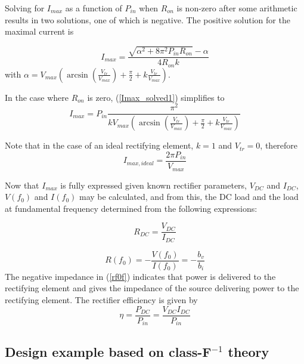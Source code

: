 Solving for $I_{max}$ as a function of $P_{in}$ when $R_{on}$ is non-zero after some arithmetic results in two solutions, one of which is negative. The positive solution for the maximal current is

\begin{equation}\label{Imax_solved1}
    I_{max} = \frac{ \sqrt{\alpha^2 + 8\pi^2P_{in}R_{on}}-\alpha}{4R_{on}k}
\end{equation}
with $\alpha=V_{max}\left(\arcsin\left(\frac{V_{tr}}{V_{max}}\right)+ \frac{\pi}{2} + k\frac{V_{tr}}{V_{max}}\right)$.

In the case where $R_{on}$ is zero, (\ref{Imax_solved1}) simplifies to
\begin{equation}\label{Imax_solve_zeroron_solved}
    I_{max} = P_{in}\frac{\pi^2}{kV_{max}\left(\arcsin\left(\frac{V_{tr}}{V_{max}}\right)+ \frac{\pi}{2} + k\frac{V_{tr}}{V_{max}}\right)}
\end{equation}

Note that in the case of an ideal rectifying element, $k = 1$ and $V_{tr} = 0$, therefore
\begin{equation}\label{Imax_solve_zeroron_solved_ideal}
    I_{max,ideal} = \frac{2\pi P_{in}}{V_{max}}
\end{equation}

Now that $I_{max}$ is fully expressed given known rectifier parameters, $V_{DC}$ and $I_{DC}$, $V(f_0)$ and $I(f_0)$ may be calculated, and from this, the DC load and the load at fundamental frequency determined from the following expressions:

\begin{equation}\label{rdcf}
    R_{DC} = \frac{V_{DC}}{I_{DC}}
\end{equation}

\begin{equation}\label{rf0f}
    R(f_0) = -\frac{V(f_0)}{I(f_0)} = -\frac{b_v}{b_i}
\end{equation}
The negative impedance in (\ref{rf0f}) indicates that power is delivered to the rectifying element and gives the impedance of the source delivering power to the rectifying element.  The rectifier efficiency is given by
\begin{equation}\label{efff}
    \eta = \frac{P_{DC}}{P_{in}} = \frac{V_{DC}I_{DC}}{P_{in}}
\end{equation}

\subsection {Design example based on class-F$^{-1}$ theory}

